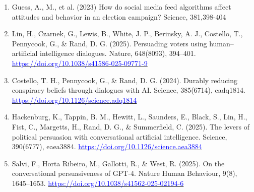 \documentclass[aspectratio=169]{beamer}
\begin{document}
\begin{frame}
\begin{enumerate}
        \item Guess, A., M., et al. (2023) How do social media feed algorithms affect attitudes and behavior in an election campaign? Science, 381,398-404 \href{https://doi.org/10.1126/science.abp9364}{\color{blue}{https://doi.org/10.1126/science.abp9364}}
        \item Lin, H., Czarnek, G., Lewis, B., White, J. P., Berinsky, A. J., Costello, T., Pennycook, G., \& Rand, D. G. (2025). Persuading voters using human–artificial intelligence dialogues. Nature, 648(8093), 394–401. \href{https://doi.org/10.1038/s41586-025-09771-9}{\textcolor{blue}{https://doi.org/10.1038/s41586-025-09771-9}}
        \item Costello, T. H., Pennycook, G., \& Rand, D. G. (2024). Durably reducing conspiracy beliefs through dialogues with AI. Science, 385(6714), eadq1814. \href{https://doi.org/10.1126/science.adq1814}{\textcolor{blue}{https://doi.org/10.1126/science.adq1814}}
        \item Hackenburg, K., Tappin, B. M., Hewitt, L., Saunders, E., Black, S., Lin, H., Fist, C., Margetts, H., Rand, D. G., \& Summerfield, C. (2025). The levers of political persuasion with conversational artificial intelligence. Science, 390(6777), eaea3884. \href{https://doi.org/10.1126/science.aea3884}{\textcolor{blue}{https://doi.org/10.1126/science.aea3884}}
        \item Salvi, F., Horta Ribeiro, M., Gallotti, R., \& West, R. (2025). On the conversational persuasiveness of GPT-4. Nature Human Behaviour, 9(8), 1645–1653. \href{https://doi.org/10.1038/s41562-025-02194-6}{\textcolor{blue}{https://doi.org/10.1038/s41562-025-02194-6}}
    \end{enumerate}
\end{frame}
\end{document}
